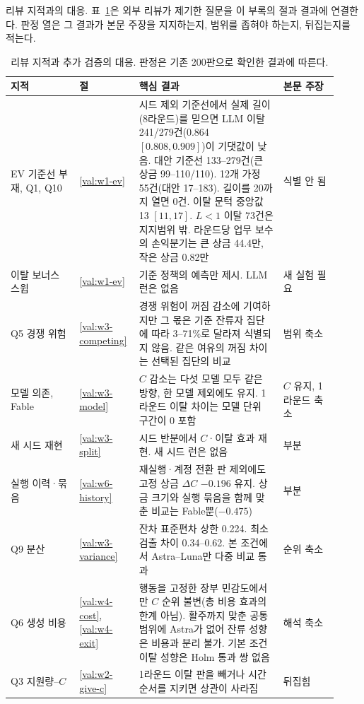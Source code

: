 리뷰 지적과의 대응. 표~\ref{val:map}은 외부 리뷰가 제기한 질문을 이 부록의 절과 결과에 연결한다. 판정 열은 그 결과가 본문 주장을 지지하는지, 범위를 좁혀야 하는지, 뒤집는지를 적는다.

\begin{table}[h]
\centering
\caption{리뷰 지적과 추가 검증의 대응. 판정은 기존 200판으로 확인한 결과에 따른다.}
\label{val:map}
\small
\renewcommand{\arraystretch}{1.12}
\begin{tabular}{p{0.20\linewidth}p{0.14\linewidth}p{0.42\linewidth}p{0.16\linewidth}}
\toprule
지적 & 절 & 핵심 결과 & 본문 주장 \\
\midrule
EV 기준선 부재, Q1, Q10 & \ref{val:w1-ev} & 시드 제외 기준선에서 실제 길이(8라운드)를 믿으면 LLM 이탈 241/279건(0.864 $[0.808, 0.909]$)이 기댓값이 낮음. 대안 기준선 133--279건(큰 상금 99--110/110). 12개 가정 55건(대안 17--183). 길이를 20까지 열면 0건. 이탈 문턱 중앙값 13 $[11, 17]$. $L<1$ 이탈 73건은 지지범위 밖. 라운드당 업무 보수의 손익분기는 큰 상금 44.4만, 작은 상금 0.82만 & 식별 안 됨 \\
이탈 보너스 스윕 & \ref{val:w1-ev} & 기준 정책의 예측만 제시. LLM 런은 없음 & 새 실험 필요 \\
Q5 경쟁 위험 & \ref{val:w3-competing} & 경쟁 위험이 꺼짐 감소에 기여하지만 그 몫은 기준 잔류자 집단에 따라 3--71\%로 달라져 식별되지 않음. 같은 여유의 꺼짐 차이는 선택된 집단의 비교 & 범위 축소 \\
모델 의존, Fable & \ref{val:w3-model} & $C$ 감소는 다섯 모델 모두 같은 방향, 한 모델 제외에도 유지. 1라운드 이탈 차이는 모델 단위 구간이 0 포함 & $C$ 유지, 1라운드 축소 \\
새 시드 재현 & \ref{val:w3-split} & 시드 반분에서 $C$·이탈 효과 재현. 새 시드 런은 없음 & 부분 \\
실행 이력·묶음 & \ref{val:w6-history} & 재실행·계정 전환 판 제외에도 고정 상금 $\Delta C$ $-0.196$ 유지. 상금 크기와 실행 묶음을 함께 맞춘 비교는 Fable뿐($-0.475$) & 부분 \\
Q9 분산 & \ref{val:w3-variance} & 잔차 표준편차 상한 0.224. 최소 검출 차이 0.34--0.62. 본 조건에서 Astra--Luna만 다중 비교 통과 & 순위 축소 \\
Q6 생성 비용 & \ref{val:w4-cost}, \ref{val:w4-exit} & 행동을 고정한 장부 민감도에서만 $C$ 순위 불변(총 비용 효과의 한계 아님). 활주까지 맞춘 공통 범위에 Astra가 없어 잔류 성향은 비용과 분리 불가. 기본 조건 이탈 성향은 Holm 통과 쌍 없음 & 해석 축소 \\
Q3 지원량--$C$ & \ref{val:w2-give-c} & 1라운드 이탈 판을 빼거나 시간 순서를 지키면 상관이 사라짐 & 뒤집힘 \\

\end{tabular}
\end{table}
